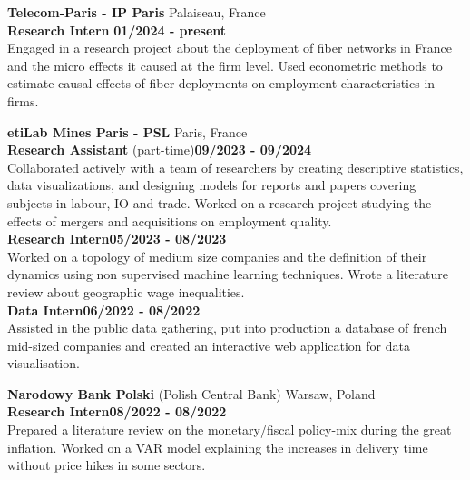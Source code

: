     \vspace{0.15cm}
    
    \noindent\textbf{Telecom-Paris - IP Paris} \hfill Palaiseau, France\\[0.1cm]
    \textbf{Research Intern} \hfill \textbf{01/2024  - present} \\
	Engaged in a research project about the deployment of fiber networks in France and the micro effects it caused at the firm level. Used econometric methods to estimate causal effects of fiber deployments on employment characteristics in firms.

    \vspace{0.15cm}

    \noindent\textbf{etiLab Mines Paris - PSL} \hfill Paris, France\\[0.1cm]
    \textbf{Research Assistant} (part-time)\hfill \textbf{09/2023 - 09/2024} \\
    Collaborated actively with a team of researchers by creating descriptive statistics, data visualizations, and designing models for reports and papers covering subjects in labour, IO and trade. Worked on a research project studying the effects of mergers and acquisitions on employment quality.\\
    \textbf{Research Intern}\hfill \textbf{05/2023 - 08/2023} \\
    Worked on a topology of medium size companies and the definition of their dynamics using non supervised machine learning techniques. Wrote a literature review about geographic wage inequalities.  \\[0.1cm]
    \textbf{Data Intern}\hfill \textbf{06/2022 - 08/2022} \\
    Assisted in the public data gathering, put into production a database of french mid-sized companies and created an interactive web application for data visualisation.

    \vspace{0.15cm}

    \noindent\textbf{Narodowy Bank Polski} (Polish Central Bank) \hfill Warsaw, Poland\\[0.1cm]
    \textbf{Research Intern}\hfill \textbf{08/2022  - 08/2022} \\
    Prepared a literature review on the monetary/fiscal policy-mix during the great inflation. Worked on a VAR model explaining the increases in delivery time without price hikes in some sectors. 

\begin{flushleft}
\raisebox{-.6ex}{SKILLS} \hrulefill
\end{flushleft}

